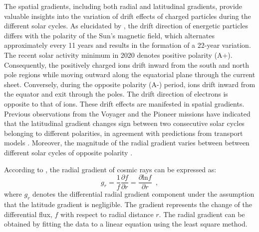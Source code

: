 The spatial gradients, including both radial and latitudinal gradients, provide valuable insights into the variation of drift effects of charged particles during the different solar cycles. As elucidated by \citet{Jokipii1977ApJ, Jokipii1979ApJ, Potgieter2013LRSP}, the drift direction of energetic particles differs with the polarity of the Sun's magnetic field, which alternates approximately every 11 years and results in the formation of a 22-year variation. The recent solar activity minimum in 2020 denotes positive polarity (A+). Consequently, the positively charged ions drift inward from the south and north pole regions while moving outward along the equatorial plane through the current sheet. Conversely, during the opposite polarity (A-) period, ions drift inward from the equator and exit through the poles. The drift direction of electrons is opposite to that of ions. These drift effects are manifested in spatial gradients. Previous observations from the Voyager and the Pioneer missions have indicated that the latitudinal gradient changes sign between two consecutive solar cycles belonging to different polarities, in agreement with predictions from transport models \citep{Mckibben1979ApJ, Cummings1987GeoRL, Christon1986JGR}. Moreover, the magnitude of the radial gradient varies between between different solar cycles of opposite polarity \citep{Rankin2021ApJ,Rankin2022ApJ,Giacalone2022SSRv,Webber1981JGR,Marsden1999AdSpR}.

According to \citet{Rankin2021ApJ}, the radial gradient of cosmic rays can be expressed as:
\begin{equation}
    g_r = \frac{1}{f}\frac{\partial{f}}{\partial{r}} = \frac{\partial{\mathrm{ln} f}}{\partial{r}} \enspace ,
    \label{eq:radial_gradient}
\end{equation}
where $g_r$ denotes the differential radial gradient component under the assumption that the latitude gradient is negligible. The gradient represents the change of the differential flux, $f$ with respect to radial distance $r$. The radial gradient can be obtained by fitting the data to a linear equation using the least square method.


